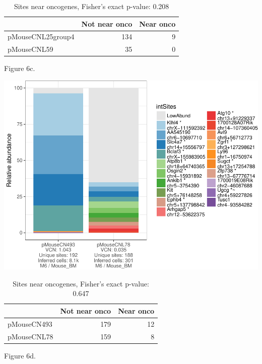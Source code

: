 \documentclass[12pt,]{article}
\begin{document}
\begin{table}[!h]

\caption{\label{tab:unnamed-chunk-3}Sites near oncogenes, Fisher's exact p-value: 0.208}
\centering
\begin{tabular}[t]{lrr}
\toprule
  & Not near onco & Near onco\\
\midrule
pMouseCNL25group4 & 134 & 9\\
pMouseCNL59 & 35 & 0\\
\bottomrule
\end{tabular}
\end{table}

\newpage

Figure 6c.

\includegraphics{project_files/figure-latex/unnamed-chunk-3-3.pdf}
\vspace{1.0cm}

\begin{table}[!h]

\caption{\label{tab:unnamed-chunk-3}Sites near oncogenes, Fisher's exact p-value: 0.647}
\centering
\begin{tabular}[t]{lrr}
\toprule
  & Not near onco & Near onco\\
\midrule
pMouseCN493 & 179 & 12\\
pMouseCNL78 & 159 & 8\\
\bottomrule
\end{tabular}
\end{table}

\newpage

Figure 6d.
\end{document}
